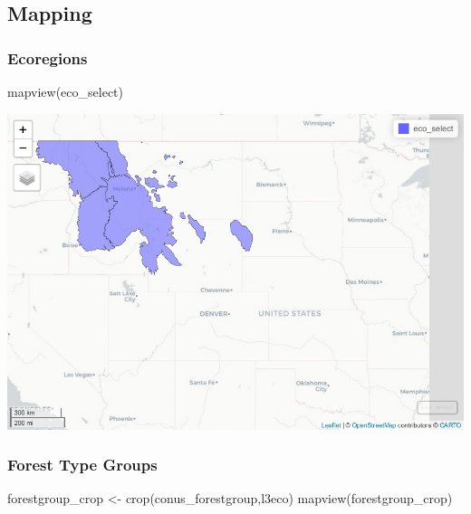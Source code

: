 \documentclass[
]{book}
\newenvironment{Shaded}{\begin{snugshade}}{\end{snugshade}}
\newcommand{\FunctionTok}[1]{\textcolor[rgb]{0.00,0.00,0.00}{#1}}
\newcommand{\NormalTok}[1]{#1}
\newcommand{\OtherTok}[1]{\textcolor[rgb]{0.56,0.35,0.01}{#1}}
\begin{document}
\hypertarget{mapping}{%
\subsection{Mapping}\label{mapping}}

\hypertarget{ecoregions}{%
\subsubsection{Ecoregions}\label{ecoregions}}

\begin{Shaded}
\begin{Highlighting}[]
\FunctionTok{mapview}\NormalTok{(eco\_select)}
\end{Highlighting}
\end{Shaded}

\includegraphics{_main_files/figure-latex/mapping ecoregion-1.pdf}

\hypertarget{forest-type-groups}{%
\subsubsection{Forest Type Groups}\label{forest-type-groups}}

\begin{Shaded}
\begin{Highlighting}[]
\NormalTok{forestgroup\_crop }\OtherTok{\textless{}{-}} \FunctionTok{crop}\NormalTok{(conus\_forestgroup,l3eco)}
\FunctionTok{mapview}\NormalTok{(forestgroup\_crop)}
\end{Highlighting}
\end{Shaded}
\end{document}
